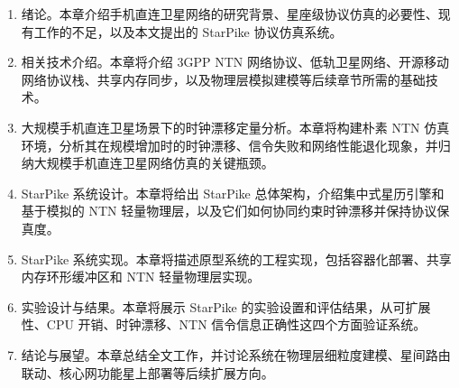 \begin{enumerate}
    \item 绪论。本章介绍手机直连卫星网络的研究背景、星座级协议仿真的必要性、现有工作的不足，以及本文提出的 StarPike 协议仿真系统。
    \item 相关技术介绍。本章将介绍 3GPP NTN 网络协议、低轨卫星网络、开源移动网络协议栈、共享内存同步，以及物理层模拟建模等后续章节所需的基础技术。
    \item 大规模手机直连卫星场景下的时钟漂移定量分析。本章将构建朴素 NTN 仿真环境，分析其在规模增加时的时钟漂移、信令失败和网络性能退化现象，并归纳大规模手机直连卫星网络仿真的关键瓶颈。
    \item StarPike 系统设计。本章将给出 StarPike 总体架构，介绍集中式星历引擎和基于模拟的 NTN 轻量物理层，以及它们如何协同约束时钟漂移并保持协议保真度。
    \item StarPike 系统实现。本章将描述原型系统的工程实现，包括容器化部署、共享内存环形缓冲区和 NTN 轻量物理层实现。
    \item 实验设计与结果。本章将展示 StarPike 的实验设置和评估结果，从可扩展性、CPU 开销、时钟漂移、NTN 信令信息正确性这四个方面验证系统。
    \item 结论与展望。本章总结全文工作，并讨论系统在物理层细粒度建模、星间路由联动、核心网功能星上部署等后续扩展方向。
\end{enumerate}
